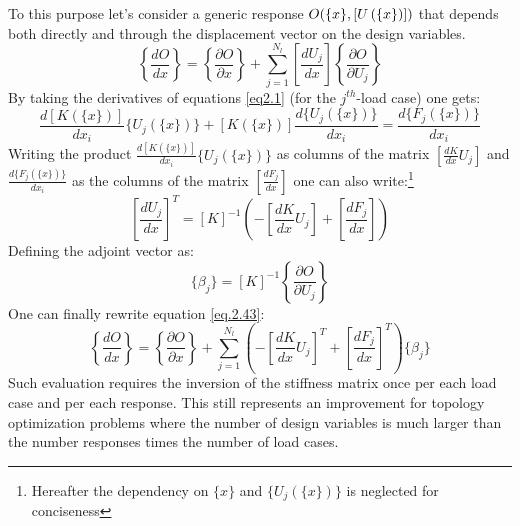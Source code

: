   To this purpose let's consider a generic response $O(\lbrace x\rbrace,  \left[{U\left(\lbrace x\rbrace\right)}\right])$ that depends both directly and  through the displacement vector on the design variables. 
  \begin{equation}
  \label{eq.2.43}
  \left\lbrace\frac{d O }{dx}\right\rbrace=\left\lbrace\frac{ \partial O }{ \partial x}\right\rbrace+\sum_{j=1}^{N_l}{\left[\frac{d U_j }{ d x}\right]\left\lbrace\frac{ \partial O }{ \partial U_j}\right\rbrace}
  \end{equation}
  By taking the derivatives of equations \ref{eq2.1} (for the $j^{th}$-load case) one gets:
   \begin{equation}
   \label{eq.2.41}
   \frac{d\left[K(\lbrace x\rbrace)\right]}{dx_i}\lbrace U_j (\lbrace x\rbrace) \rbrace+\left[K(\lbrace x\rbrace)\right]\frac{d \lbrace U_j (\lbrace x\rbrace) \rbrace}{dx_i} = \frac{d\lbrace F_j(\lbrace x\rbrace) \rbrace}{dx_i} 
   \end{equation}
   Writing the product $\frac{d\left[K(\lbrace x\rbrace)\right]}{dx_i}\lbrace U_j (\lbrace x\rbrace) \rbrace$ as columns of the matrix $\left[\frac{dK}{dx}U_j\right]$ and $\frac{d\lbrace F_j(\lbrace x\rbrace) \rbrace}{dx_i} $ as the columns of the matrix $\left[\frac{dF_j}{dx}\right]$ one can also write:\footnote{Hereafter the dependency on $\lbrace x\rbrace$ and $\lbrace U_j (\lbrace x\rbrace) \rbrace$ is neglected for conciseness}
   \begin{equation}
   \left[\frac{d U_j }{ d x}\right]^T=\left[K\right]^{-1}\left(-\left[\frac{dK}{dx}U_j\right] +\left[\frac{dF_j}{dx}\right]\right)
   \end{equation}
   Defining the adjoint vector as:
   \begin{equation}
   \label{eq.2.46}
   \lbrace\beta_j  \rbrace=\left[K\right]^{-1}\left\lbrace\frac{ \partial O }{ \partial U_j}\right\rbrace
   \end{equation}
   One can finally rewrite equation \ref{eq.2.43}:
   \begin{equation}
   \label{eq.2.47}
   \left\lbrace\frac{d O }{dx}\right\rbrace=\left\lbrace\frac{ \partial O }{ \partial x}\right\rbrace+\sum_{j=1}^{N_l}{\left(-\left[\frac{dK}{dx}U_j\right]^T +\left[\frac{dF_j}{dx}\right]^T\right)\lbrace\beta_j \rbrace}
   \end{equation}
   Such evaluation requires the inversion of the stiffness matrix once per each load case and per each response. 
   This still represents an improvement for topology optimization problems where the number of design variables is much larger than the number responses times the number of load cases.
